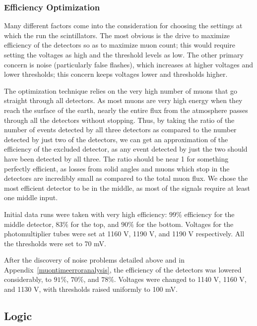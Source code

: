 \subsubsection{Efficiency Optimization}
\label{efficiencyoptimization}

Many different factors come into the consideration for choosing the settings at which the run the scintillators. The most obvious is the drive to maximize efficiency of the detectors so as to maximize muon count; this would require setting the voltages as high and the threshold levels as low. The other primary concern is noise (particularly false flashes), which increases at higher voltages and lower thresholds; this concern keeps voltages lower and thresholds higher.

The optimization technique relies on the very high number of muons that go straight through all detectors. As most muons are very high energy when they reach the surface of the earth, nearly the entire flux from the atmosphere passes through all the detectors without stopping. Thus, by taking the ratio of the number of events detected by all three detectors as compared to the number detected by just two of the detectors, we can get an approximation of the efficiency of the excluded detector, as any event detected by just the two should have been detected by all three. The ratio should be near 1 for something perfectly efficient, as losses from solid angles and muons which stop in the detectors are incredibly small as compared to the total muon flux. We chose the most efficient detector to be in the middle, as most of the signals require at least one middle input.

Initial data runs were taken with very high efficiency: $99\%$ efficiency for the middle detector, $83\%$ for the top, and $90\%$ for the bottom. Voltages for the photomultiplier tubes were set at 1160 V, 1190 V, and 1190 V respectively. All the thresholds were set to 70 mV. 

After the discovery of noise problems detailed above and in Appendix~\ref{muontimeerroranalysis}, the efficiency of the detectors was lowered considerably, to $91\%$, $70\%$, and $78\%$. Voltages were changed to 1140 V, 1160 V, and 1130 V, with thresholds raised uniformly to 100 mV.

\subsection{Logic}
\label{logic}

